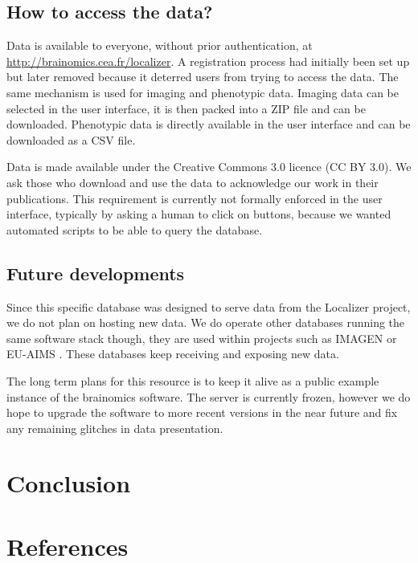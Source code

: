 \documentclass[review]{elsarticle}
\begin{document}
\subsection{How to access the data?}

Data is available to everyone, without prior authentication, at
\url{http://brainomics.cea.fr/localizer}. A registration process
had initially been set up but later removed because it deterred
users from trying to access the data. The same mechanism is used
for imaging and phenotypic data. Imaging data can be selected in the
user interface, it is then packed into a ZIP file and can be downloaded.
Phenotypic data is directly available in the user interface and can be
downloaded as a CSV file.

Data is made available under the Creative Commons 3.0 licence (CC BY 3.0). We ask those who download and use the data to acknowledge our work in their publications. This requirement is currently not formally enforced in the user interface, typically by asking a human to click on buttons, because we wanted automated scripts to be able to query the database.


\subsection{Future developments}

Since this specific database was designed to serve data from the Localizer
project, we do not plan on hosting new data. We do operate other databases
running the same software stack though, they are used within projects such as
IMAGEN \cite{Imagen2010} or EU-AIMS \cite{Aims2014}. These databases
keep receiving and exposing new data.

The long term plans for this resource is to keep it alive as a public
example instance of the {brainomics} software. The server is currently
frozen, however we do hope to upgrade the software to more recent versions
in the near future and fix any remaining glitches in data presentation.


\section{Conclusion}


\section*{References}


\end{document}
